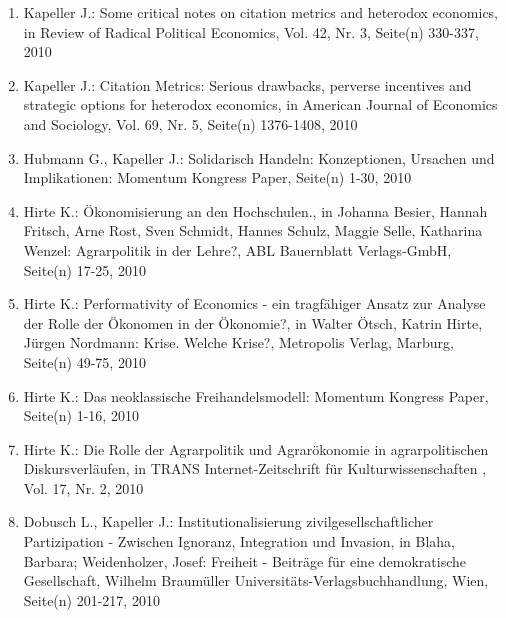 \begin{enumerate}
	 \item Kapeller J.: Some critical notes on citation metrics and heterodox economics, in Review of Radical Political Economics, Vol. 42, Nr. 3, Seite(n) 330-337, 2010
	 \item Kapeller J.: Citation Metrics: Serious drawbacks, perverse incentives and strategic options for heterodox economics, in American Journal of Economics and Sociology, Vol. 69, Nr. 5, Seite(n) 1376-1408, 2010
	 \item Hubmann G., Kapeller J.: Solidarisch Handeln: Konzeptionen, Ursachen und Implikationen: Momentum Kongress Paper, Seite(n) 1-30, 2010
	 \item Hirte K.: Ökonomisierung an den Hochschulen., in Johanna Besier, Hannah Fritsch, Arne Rost, Sven Schmidt, Hannes Schulz, Maggie Selle, Katharina Wenzel: Agrarpolitik in der Lehre?, ABL Bauernblatt Verlags-GmbH, Seite(n) 17-25, 2010
	 \item Hirte K.: Performativity of Economics - ein tragfähiger Ansatz zur Analyse der Rolle der Ökonomen in der Ökonomie?, in Walter Ötsch, Katrin Hirte, Jürgen Nordmann: Krise. Welche Krise?, Metropolis Verlag, Marburg, Seite(n) 49-75, 2010
	 \item Hirte K.: Das neoklassische Freihandelsmodell: Momentum Kongress Paper, Seite(n) 1-16, 2010
	 \item Hirte K.: Die Rolle der Agrarpolitik und Agrarökonomie in agrarpolitischen Diskursverläufen, in TRANS Internet-Zeitschrift für Kulturwissenschaften , Vol. 17, Nr. 2, 2010
	 \item Dobusch L., Kapeller J.: Institutionalisierung zivilgesellschaftlicher Partizipation - Zwischen Ignoranz, Integration und Invasion, in Blaha, Barbara; Weidenholzer, Josef: Freiheit - Beiträge für eine demokratische Gesellschaft, Wilhelm Braumüller Universitäts-Verlagsbuchhandlung, Wien, Seite(n) 201-217, 2010
\end{enumerate}
